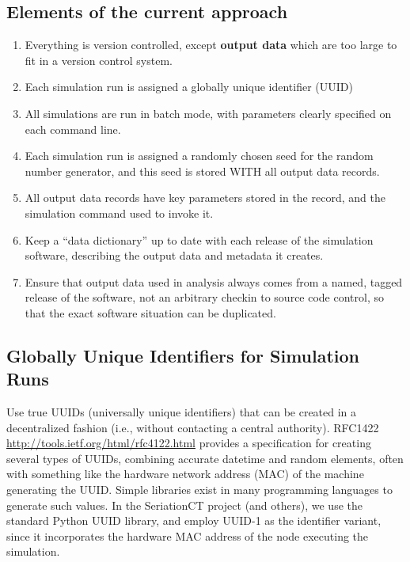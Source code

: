 \documentclass[preprint,times,authoryear,10pt]{elsarticle}
\begin{document}
\subsection{Elements of the current
approach}\label{elements-of-the-current-approach}

\begin{enumerate}
\def\labelenumi{\arabic{enumi}.}
\itemsep1pt\parskip0pt
\item
  Everything is version controlled, except \textbf{output data} which
  are too large to fit in a version control system.
\item
  Each simulation run is assigned a globally unique identifier (UUID)
\item
  All simulations are run in batch mode, with parameters clearly
  specified on each command line.
\item
  Each simulation run is assigned a randomly chosen seed for the random
  number generator, and this seed is stored WITH all output data
  records.
\item
  All output data records have key parameters stored in the record, and
  the simulation command used to invoke it.\\
\item
  Keep a ``data dictionary'' up to date with each release of the
  simulation software, describing the output data and metadata it
  creates.
\item
  Ensure that output data used in analysis always comes from a named,
  tagged release of the software, not an arbitrary checkin to source
  code control, so that the exact software situation can be duplicated.
\end{enumerate}

\subsection{Globally Unique Identifiers for Simulation
Runs}\label{globally-unique-identifiers-for-simulation-runs}

Use true UUIDs (universally unique identifiers) that can be created in a
decentralized fashion (i.e., without contacting a central authority).
RFC1422 \url{http://tools.ietf.org/html/rfc4122.html} provides a
specification for creating several types of UUIDs, combining accurate
datetime and random elements, often with something like the hardware
network address (MAC) of the machine generating the UUID. Simple
libraries exist in many programming languages to generate such values.
In the SeriationCT project (and others), we use the standard Python UUID
library, and employ UUID-1 as the identifier variant, since it
incorporates the hardware MAC address of the node executing the
simulation.
\end{document}
